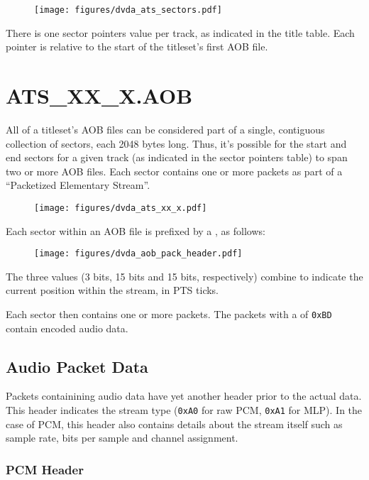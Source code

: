\begin{figure}[h]
\texttt{[image: figures/dvda\_ats\_sectors.pdf]}
\end{figure}
\par
\noindent
There is one sector pointers value per track,
as indicated in the title table.
Each pointer is relative to the start of the titleset's first
AOB file.

\clearpage

\section{ATS\_XX\_X.AOB}

All of a titleset's AOB files can be considered part of a
single, contiguous collection of sectors, each 2048 bytes long.
Thus, it's possible for the start and end sectors for a given track
(as indicated in the sector pointers table) to span two or more
AOB files.
Each sector contains one or more packets as part of a
``Packetized Elementary Stream''.

\begin{figure}[h]
\texttt{[image: figures/dvda\_ats\_xx\_x.pdf]}
\end{figure}
\par
\noindent
Each sector within an AOB file is prefixed by a ,
as follows:
\begin{figure}[h]
\texttt{[image: figures/dvda\_aob\_pack\_header.pdf]}
\end{figure}
\par
\noindent
The three  values (3 bits, 15 bits and 15 bits, respectively)
combine to indicate the current position within the stream, in PTS ticks.
\par
Each sector then contains one or more packets.
The packets with a  of \texttt{0xBD} contain
encoded audio data.

\clearpage

\subsection{Audio Packet Data}

Packets containining audio data have yet another header
prior to the actual data.
This header indicates the stream type (\texttt{0xA0} for raw PCM,
\texttt{0xA1} for MLP).
In the case of PCM, this header also contains details
about the stream itself such as sample rate, bits per sample
and channel assignment.

\subsubsection{PCM Header}

